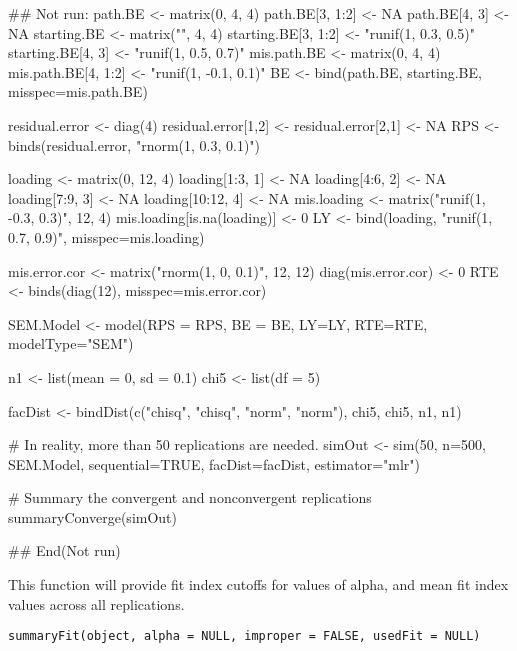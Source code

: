 \documentclass[a4paper]{book}
\begin{document}
%
\begin{Examples}
\begin{ExampleCode}
## Not run: 
path.BE <- matrix(0, 4, 4)
path.BE[3, 1:2] <- NA
path.BE[4, 3] <- NA
starting.BE <- matrix("", 4, 4)
starting.BE[3, 1:2] <- "runif(1, 0.3, 0.5)"
starting.BE[4, 3] <- "runif(1, 0.5, 0.7)"
mis.path.BE <- matrix(0, 4, 4)
mis.path.BE[4, 1:2] <- "runif(1, -0.1, 0.1)"
BE <- bind(path.BE, starting.BE, misspec=mis.path.BE)

residual.error <- diag(4)
residual.error[1,2] <- residual.error[2,1] <- NA
RPS <- binds(residual.error, "rnorm(1, 0.3, 0.1)")

loading <- matrix(0, 12, 4)
loading[1:3, 1] <- NA
loading[4:6, 2] <- NA
loading[7:9, 3] <- NA
loading[10:12, 4] <- NA
mis.loading <- matrix("runif(1, -0.3, 0.3)", 12, 4)
mis.loading[is.na(loading)] <- 0
LY <- bind(loading, "runif(1, 0.7, 0.9)", misspec=mis.loading)

mis.error.cor <- matrix("rnorm(1, 0, 0.1)", 12, 12)
diag(mis.error.cor) <- 0
RTE <- binds(diag(12), misspec=mis.error.cor)

SEM.Model <- model(RPS = RPS, BE = BE, LY=LY, RTE=RTE, modelType="SEM")

n1 <- list(mean = 0, sd = 0.1)
chi5 <- list(df = 5)

facDist <- bindDist(c("chisq", "chisq", "norm", "norm"), chi5, chi5, n1, n1)

# In reality, more than 50 replications are needed.
simOut <- sim(50, n=500, SEM.Model, sequential=TRUE, facDist=facDist, estimator="mlr")

# Summary the convergent and nonconvergent replications
summaryConverge(simOut)

## End(Not run)
\end{ExampleCode}
\end{Examples}
%
\begin{Description}\relax
This function will provide fit index cutoffs for values of alpha, and mean fit index values across all replications.
\end{Description}
%
\begin{Usage}
\begin{verbatim}
summaryFit(object, alpha = NULL, improper = FALSE, usedFit = NULL)
\end{verbatim}
\end{Usage}
%
\end{document}

